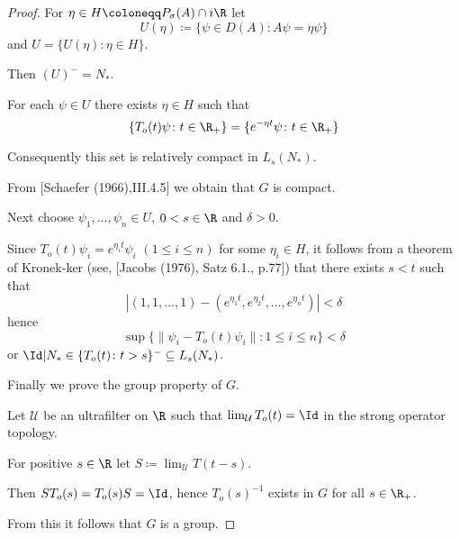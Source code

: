 \begin{proof}
For $\eta \in H \coloneqq P_{\sigma}(A) \cap i\R$ let
\[
U(\eta) \coloneqq \{\psi \in D(A): A\psi = \eta\psi\}
\]
and $U = \{U(\eta) \colon \eta \in H\}$.

Then $(U)^{-} = N_{*}$.

For each $\psi \in U$ there exists $\eta \in H$ such that
\[
\{T_{o}(t)\psi \colon t \in \R_{+}\} = \{e^{-\eta t}\psi \colon t \in \R_{+}\}
\]

Consequently this set is relatively compact in $L_{s}(N_{*})$.

From [Schaefer (1966),III.4.5] we obtain that $G$ is compact.

Next choose $\psi_{1}, ..., \psi_{n} \in U$, $0 < s \in \R$ and $\delta > 0$.

Since $T_{o}(t)\psi_{i} = e^{\eta_{i}t}\psi_{i}$ $(1 \leq i \leq n)$ for some $\eta_{i} \in H$, it follows from a theorem of Kronek-ker (see, [Jacobs (1976), Satz 6.1., p.77]) that there exists $s < t$ such that
\[
|(1,1, ..., 1) - (e^{\eta_{1}t}, e^{\eta_{2}t}, ..., e^{\eta_{n}t})| < \delta
\]
hence
\[
\sup\{\|\psi_{i} - T_{o}(t)\psi_{i}\| \colon 1 \leq i \leq n\} < \delta
\]
or $\Id|N_{*} \in \{T_{o}(t) \colon t>s\}^{-} \subseteq L_{s}(N_{*})$.






Finally we prove the group property of $G$.

Let $\mathcal{U}$ be an ultrafilter on $\R$ such that $\lim_{\mathcal{U}}T_{o}(t) = \Id$ in the strong operator topology.

For positive $s \in \R$ let $S \coloneqq \lim_{\mathcal{U}}T(t-s)$.

Then $ST_{o}(s) = T_{o}(s)S = \Id$, hence $T_{o}(s)^{-1}$ exists in $G$ for all $s \in \R_{+}$.

From this it follows that $G$ is a group.
\end{proof}

